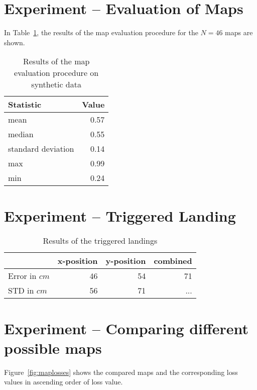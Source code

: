 \section{Experiment -- Evaluation of Maps}
\label{sec:experiment-3}

In Table~\ref{tab:mapeval}, the results of the map evaluation
procedure for the $N = 46$ maps are shown.

\begin{table}[h]
  \centering
  \begin{tabular}{lr}
    \toprule
    Statistic & Value\\
    \midrule
    mean & 0.57\\
    median & 0.55\\
    standard deviation & 0.14\\
    max & 0.99\\
    min & 0.24\\    
    \bottomrule
  \end{tabular}
  \caption[Map evaluation procedure on synthetic data]{Results of the map evaluation procedure on synthetic data}
  \label{tab:mapeval}

\end{table}

\section{Experiment -- Triggered Landing}
\label{sec:experiment-4}

\begin{table}[H]
  \centering
  \begin{tabular}{lrrr}
    \toprule
    & x-position & y-position & combined\\
    \midrule
    Error in $cm$ & 46 & 54 & 71\\
    STD in $cm$ & 56 & 71  & ...\\
    \bottomrule
  \end{tabular}
  \caption[Triggered landings]{Results of the triggered landings}
  \label{tab:targetlanding}

\end{table}

\section{Experiment -- Comparing different possible maps}
\label{sec:experiment-6}

Figure~\ref{fig:maplosses} shows the compared maps and the
corresponding loss values in ascending order of loss value.

